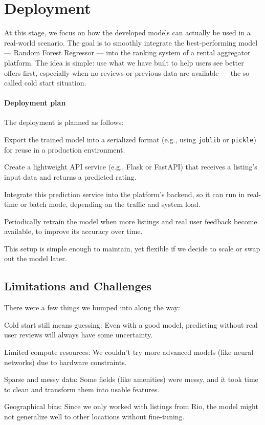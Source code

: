 \section{Deployment}\label{chap:deployment}

At this stage, we focus on how the developed models can actually be used in a real-world scenario. The goal is to smoothly integrate the best-performing model --- Random Forest Regressor --- into the ranking system of a rental aggregator platform. The idea is simple: use what we have built to help users see better offers first, especially when no reviews or previous data are available --- the so-called cold start situation.

\paragraph{Deployment plan}
The deployment is planned as follows:

Export the trained model into a serialized format (e.g., using \texttt{joblib} or \texttt{pickle}) for reuse in a production environment.

Create a lightweight API service (e.g., Flask or FastAPI) that receives a listing's input data and returns a predicted rating.

Integrate this prediction service into the platform's backend, so it can run in real-time or batch mode, depending on the traffic and system load.

Periodically retrain the model when more listings and real user feedback become available, to improve its accuracy over time.

This setup is simple enough to maintain, yet flexible if we decide to scale or swap out the model later.

\subsection{Limitations and Challenges }\label{sec:limitation}

There were a few things we bumped into along the way:

Cold start still means guessing: Even with a good model, predicting without real user reviews will always have some uncertainty.

Limited compute resources: We couldn't try more advanced models (like neural networks) due to hardware constraints.

Sparse and messy data: Some fields (like amenities) were messy, and it took time to clean and transform them into usable features.

Geographical bias: Since we only worked with listings from Rio, the model might not generalize well to other locations without fine-tuning.

